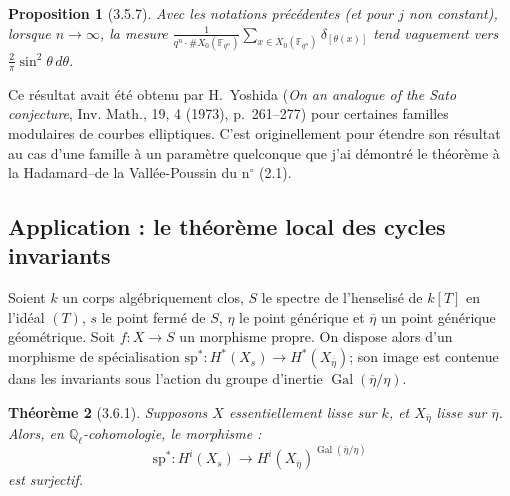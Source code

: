 \documentclass[12pt,a4paper]{article}
\theoremstyle{plain}
\newtheorem{theorem}{Th\'eor\`eme}[section]
\newtheorem{proposition}[theorem]{Proposition}
\theoremstyle{definition}
\theoremstyle{remark}
\DeclareMathOperator{\Gal}{Gal}
\newcommand{\FF}{{\mathbb{F}}}
\newcommand{\QQ}{{\mathbb{Q}}}
\begin{document}
\begin{proposition}[3.5.7]
Avec les notations pr\'ec\'edentes (et pour $j$ non constant), lorsque $n \to \infty$, la mesure $\frac{1}{q^n \cdot \#X_0(\FF_{q^n})} \sum_{x \in X_0(\FF_{q^n})} \delta_{[\theta(x)]}$ tend vaguement vers $\frac{2}{\pi} \sin^2\theta\, d\theta$.
\end{proposition}

Ce r\'esultat avait \'et\'e obtenu par H.~Yoshida (\textit{On an analogue of the Sato conjecture}, Inv. Math., 19, 4 (1973), p.~261--277) pour certaines familles modulaires de courbes elliptiques. C'est originellement pour \'etendre son r\'esultat au cas d'une famille \`a un param\`etre quelconque que j'ai d\'emontr\'e le th\'eor\`eme \`a la Hadamard--de la Vall\'ee-Poussin du n$^\circ$ (2.1).


\subsection{Application : le th\'eor\`eme local des cycles invariants}

Soient $k$ un corps alg\'ebriquement clos, $S$ le spectre de l'henselis\'e de $k[T]$ en l'id\'eal $(T)$, $s$ le point ferm\'e de $S$, $\eta$ le point g\'en\'erique et $\overline{\eta}$ un point g\'en\'erique g\'eom\'etrique. Soit $f : X \to S$ un morphisme propre. On dispose alors d'un morphisme de sp\'ecialisation $\mathrm{sp}^* : H^*(X_s) \to H^*(X_{\overline{\eta}})$; son image est contenue dans les invariants sous l'action du groupe d'inertie $\Gal(\overline{\eta}/\eta)$.

\begin{theorem}[3.6.1]
Supposons $X$ essentiellement lisse sur $k$, et $X_{\overline{\eta}}$ lisse sur $\overline{\eta}$. Alors, en $\QQ_\ell$-cohomologie, le morphisme :
\[ \mathrm{sp}^* : H^i(X_s) \to H^i(X_{\overline{\eta}})^{\Gal(\overline{\eta}/\eta)} \]
est surjectif.
\end{theorem}
\end{document}
